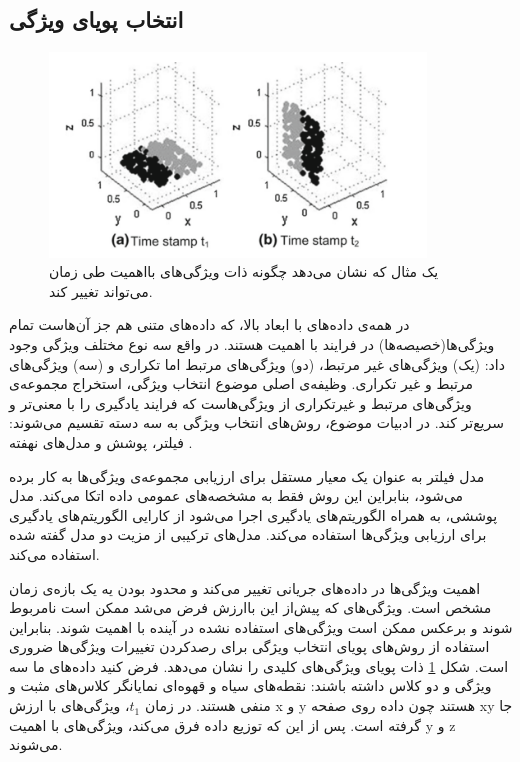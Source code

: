 \subsection{انتخاب پویای ویژگی}

\begin{figure}%
\centerline{\includegraphics[width=10cm]{dynamic_feature}}
\caption{یک مثال که نشان می‌دهد چگونه ذات ویژگی‌های بااهمیت طی زمان می‌تواند تغییر کند.}
\label{fig:dynamic_feature}
\end{figure}

در همه‌ی داده‌های با ابعاد بالا، که داده‌های متنی هم جز آن‌هاست تمام ویژگی‌ها(خصیصه‌ها) در فرایند با اهمیت هستند. در واقع سه نوع مختلف ویژگی وجود داد: (یک) ویژگی‌های غیر مرتبط، (دو) ویژگی‌های مرتبط اما تکراری و (سه) ویژگی‌های مرتبط و غیر تکراری. وظیفه‌ی اصلی موضوع انتخاب ویژگی، استخراج مجموعه‌ی ویژگی‌های مرتبط و غیرتکراری از ویژگی‌هاست که فرایند یادگیری را با معنی‌تر و سریع‌تر کند. در ادبیات موضوع، روش‌های انتخاب ویژگی به سه دسته تقسیم می‌شوند: فیلتر، پوشش
و مدل‌های نهفته
 \cite{liu2005toward}.

مدل فیلتر به عنوان یک معیار مستقل برای ارزیابی مجموعه‌ی ویژگی‌ها به‌ کار برده می‌شود، بنابراین این روش فقط به مشخصه‌های عمومی داده اتکا می‌کند. مدل پوششی، به همراه الگوریتم‌های یادگیری اجرا می‌شود از کارایی الگوریتم‌های یادگیری برای ارزیابی ویژگی‌ها استفاده می‌کند. مدل‌های ترکیبی از مزیت دو مدل گفته شده استفاده می‌کند.

اهمیت ویژگی‌ها در داده‌های جریانی تغییر می‌کند و محدود بودن یه یک بازه‌ی زمان مشخص است. ویژگی‌های که پیش‌از این باارزش فرض‌ می‌شد ممکن است نامربوط شوند و برعکس ممکن است ویژگی‌های استفاده نشده در آینده با اهمیت شوند. بنابراین استفاده از روش‌های پویای انتخاب ویژگی برای رصدکردن تغییرات ویژگی‌ها ضروری است. شکل
\ref{fig:dynamic_feature} \cite{Nguyen2015}
ذات پویای ویژگی‌های کلیدی را نشان می‌دهد. فرض کنید داده‌های ما سه ویژگی و دو کلاس داشته باشند: نقطه‌های سیاه و قهوه‌ای نمایانگر کلاس‌های مثبت و منفی هستند. در زمان $t_1 $، ویژگی‌های با ارزش x و y هستند چون داده روی صفحه xy جا گرفته است. پس از این که توزیع داده فرق می‌کند، ویژگی‌های با اهمیت y و z می‌شوند.

